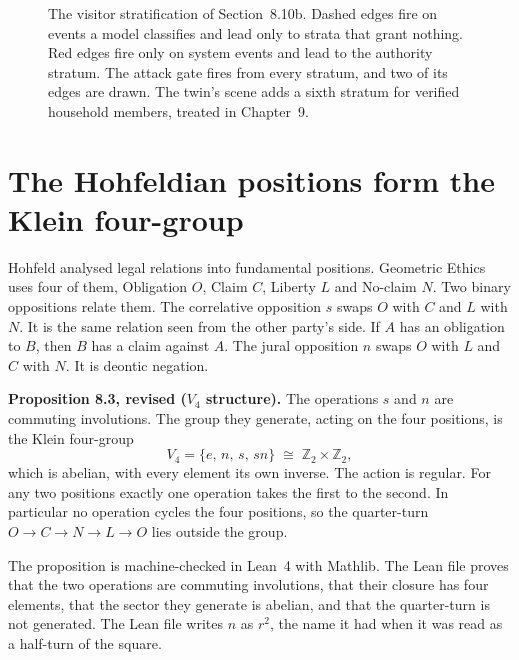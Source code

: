 \begin{figure}[t]
\centering

\caption{The visitor stratification of Section~8.10b. Dashed edges fire on events a model
classifies and lead only to strata that grant nothing. Red edges fire only on system events and
lead to the authority stratum. The attack gate fires from every stratum, and two of its edges are
drawn. The twin's scene adds a sixth stratum for verified household members, treated in
Chapter~9.}
\label{fig:ge-visitor}
\end{figure}

\section{The Hohfeldian positions form the Klein four-group}\label{sec:ge-hohfeld}

Hohfeld analysed legal relations into fundamental positions.\cite{hohfeld1917fundamental}
Geometric Ethics uses four of them, Obligation $O$, Claim $C$, Liberty $L$ and No-claim $N$.
Two binary oppositions relate them.
The correlative opposition $s$ swaps $O$ with $C$ and $L$ with $N$. It is the same relation seen
from the other party's side. If $A$ has an obligation to $B$, then $B$ has a claim against $A$.
The jural opposition $n$ swaps $O$ with $L$ and $C$ with $N$. It is deontic negation.

\medskip\noindent\textbf{Proposition 8.3, revised ($V_4$ structure).} The operations $s$ and $n$
are commuting involutions. The group they generate, acting on the four positions, is the Klein
four-group
\begin{equation}
V_4 = \{e,\, n,\, s,\, sn\} \;\cong\; \mathbb{Z}_2 \times \mathbb{Z}_2 ,
\label{eq:ge-v4}
\end{equation}
which is abelian, with every element its own inverse. The action is regular. For any two positions
exactly one operation takes the first to the second. In particular no operation cycles the four
positions, so the quarter-turn $O\to C\to N\to L\to O$ lies outside the group.

\medskip\noindent The proposition is machine-checked in Lean~4 with Mathlib. The Lean file proves
that the two operations are commuting involutions, that their closure has four elements, that the
sector they generate is abelian, and that the quarter-turn is not generated.
The Lean file writes $n$ as $r^2$, the name it had when it was read as a half-turn of the square.

